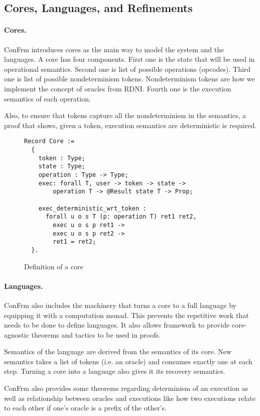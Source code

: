 \subsection{Cores, Languages, and Refinements}
\paragraph{Cores.}
ConFrm introduces cores as the main way to model the system and the languages. A core has four components. First one is the state that will be used in operational semantics. Second one is list of possible operations (opcodes). Third one is list of possible nondeterminism tokens. Nondeterminism tokens are how we implement the concept of oracles from RDNI. Fourth one is the execution semantics of each operation.

Also, to ensure that tokens capture all the nondeterminism in the semantics, a proof that shows, given a token, execution semantics are deterministic is required.


\begin{figure}[ht]
    \centering
    \begin{verbatim}
Record Core :=
  {
    token : Type;
    state : Type;
    operation : Type -> Type;
    exec: forall T, user -> token -> state ->
        operation T -> @Result state T -> Prop;
    
    exec_deterministic_wrt_token :
      forall u o s T (p: operation T) ret1 ret2,
        exec u o s p ret1 ->
        exec u o s p ret2 ->
        ret1 = ret2;
  }.
    \end{verbatim}
    \caption{Definition of a core}
    \label{fig:Core_Definition}
\end{figure}

\paragraph{Languages.}
ConFrm also includes the machinery that turns a core to a full language by equipping it with a computation monad. This prevents the repetitive work that needs to be done to define languages. It also allows framework to provide core-agnostic theorems and tactics to be used in proofs.

Semantics of the language are derived from the semantics of its core. New  semantics takes a list of tokens (i.e. an oracle) and consumes exactly one at each step. Turning a core into a language also gives it its recovery semantics.

ConFrm also provides some theorems regarding determinism of an execution as well as relationship between oracles and executions like how two executions relate to each other if one's oracle is a prefix of the other's.

